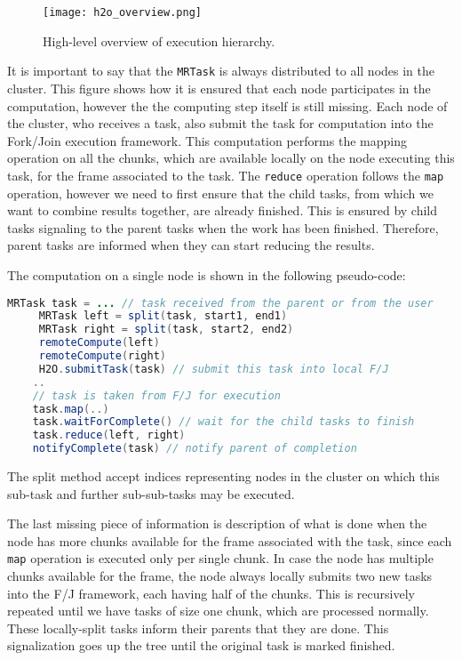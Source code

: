 \begin{figure}
	\centering
	\texttt{[image: h2o\_overview.png]}
	\caption{High-level overview of execution hierarchy.}
	\label{fig:h2o_overview}
\end{figure}

It is important to say that the \texttt{MRTask} is always distributed to all nodes in the cluster. This figure shows how it is ensured that each node participates in the computation, however the the computing step itself is still missing. Each node of the cluster, who receives a task, also submit the task for computation into the Fork/Join execution framework. This computation performs the mapping operation on all the chunks, which are available locally on the node executing this task, for the frame associated to the task. The \texttt{reduce} operation follows the \texttt{map} operation, however we need to first ensure that the child tasks, from which we want to combine results together, are already finished. This is ensured by child tasks signaling to the parent tasks when the work has been finished. Therefore, parent tasks are informed when they can start reducing the results. 

The computation on a single node is shown in the following pseudo-code:
\begin{lstlisting}[language=Java]
	 MRTask task = ... // task received from the parent or from the user
	 MRTask left = split(task, start1, end1)
	 MRTask right = split(task, start2, end2)
	 remoteCompute(left)
	 remoteCompute(right)
	 H2O.submitTask(task) // submit this task into local F/J
	..
	// task is taken from F/J for execution
	task.map(..)
	task.waitForComplete() // wait for the child tasks to finish
	task.reduce(left, right)
	notifyComplete(task) // notify parent of completion
\end{lstlisting}
The split method accept indices representing nodes in the cluster on which this sub-task and further sub-sub-tasks may be executed.

The last missing piece of information is description of what is done when the node has more chunks available for the frame associated with the task, since each \texttt{map} operation is executed only per single chunk. In case the node has multiple chunks available for the frame, the node always locally submits two new tasks into the F/J framework, each having half of the chunks. This is recursively repeated until we have tasks of size one chunk, which are processed normally. These locally-split tasks inform their parents that they are done. This signalization goes up the tree until the original task is marked finished.

